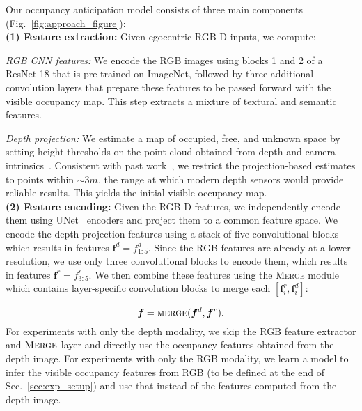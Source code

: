\documentclass[runningheads]{llncs}
\begin{document}
Our occupancy anticipation model consists of three main components (Fig.~\ref{fig:approach_figure}): \\ 
\noindent\textbf{(1) Feature extraction:} Given egocentric RGB-D inputs, we compute: 

\noindent\emph{RGB CNN features:} We encode the RGB images using blocks 1 and 2 of a ResNet-18 that is pre-trained on ImageNet, followed by three additional convolution layers that prepare these features to be passed forward with the visible occupancy map. This step extracts a mixture of textural and semantic features.

\noindent\emph{Depth projection:} We estimate a map of occupied, free, and unknown space by setting height thresholds on the point cloud obtained from depth and camera intrinsics~\cite{chen2019learning}. Consistent with past work~\cite{chen2019learning,chaplot2020learning}, we restrict the projection-based estimates to points within $\sim3\si{m}$, the range at which modern depth sensors would provide reliable results. This yields the initial visible occupancy map.\\

\noindent\textbf{(2) Feature encoding:} Given the RGB-D features, we independently encode them using UNet~\cite{ronneberger2015u} encoders and project them to a common feature space. We encode the depth projection features using a stack of five convolutional blocks which results in features $\bm{f}^{d} = f_{1:5}^{d}$. Since the RGB features are already at a lower resolution, we use only three convolutional blocks to encode them, which results in features $\bm{f}^{r} = f_{3:5}^{r}$. We then combine these features using the \textsc{Merge} module which contains layer-specific convolution blocks to merge each $[\bm{f}^{r}_{i}, \bm{f}^{d}_{i}]$: 

\begin{equation}
\bm{f} = \textsc{merge}(\bm{f}^{d}, \bm{f}^{r}).
\end{equation}
For experiments with only the depth modality, we skip the RGB feature extractor and $\textsc{Merge}$ layer and directly use the occupancy features obtained from the depth image. For experiments with only the RGB modality, we learn a model to infer the visible occupancy features from RGB (to be defined at the end of Sec.~\ref{sec:exp_setup}) and use that instead of the features computed from the depth image. \\
\end{document}

